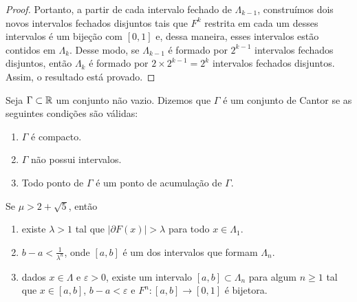\begin{proof}
Portanto, a partir de cada intervalo fechado de $\Lambda_{k-1}$, construímos dois novos intervalos fechados disjuntos tais que $F^k$ restrita em cada um desses intervalos é um bijeção com $[0, 1]$ e, dessa maneira, esses intervalos estão contidos em $\Lambda_k$. Desse modo, se $\Lambda_{k-1}$ é formado por $2^{k-1}$ intervalos fechados disjuntos, então $\Lambda_k$ é formado por $2 \times 2^{k-1} = 2^k$ intervalos fechados disjuntos. Assim, o resultado está provado.
\end{proof}

\begin{definition}
Seja $\Gamma \subset \mathbb{R}$ um conjunto não vazio. Dizemos que $\Gamma$ é um conjunto de Cantor se as seguintes condições são válidas:
\begin{enumerate}[label=\roman*.]
\item $\Gamma$ é compacto.
\item $\Gamma$ não possui intervalos.
\item Todo ponto de $\Gamma$ é um ponto de acumulação de $\Gamma$.
\end{enumerate}
\end{definition}

\begin{lemma} \label{lema conjuntosdecantor 1}
Se $\mu > 2 + \sqrt{5}$, então
\begin{enumerate}
\item  existe $\lambda > 1$ tal que $|\partial F(x)| > \lambda$ para todo $x \in \Lambda_1$.
\item $b - a < \frac{1}{\lambda^n}$, onde $[a, b]$ é um dos intervalos que formam $\Lambda_n$.
\item dados $x \in \Lambda$ e $\varepsilon > 0$, existe um intervalo $[a, b] \subset \Lambda_n$ para algum $n \geq 1$ tal que $x \in [a, b]$, $b - a < \varepsilon$ e $F^n: [a, b] \to [0,1]$ é bijetora.
\end{enumerate}
\end{lemma}

